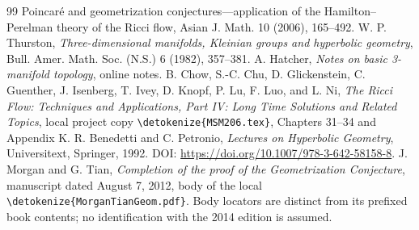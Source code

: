 \documentclass[10pt]{amsbook}
\DeclareRobustCommand{\code}[1]{\expandafter\nolinkurl\expandafter{\detokenize{#1}}}
\numberwithin{section}{chapter}
\numberwithin{equation}{chapter}
\begin{document}
\begin{thebibliography}{99}
{Poincar\'e and geometrization conjectures---application of the
Hamilton--Perelman theory of the Ricci flow}, Asian J. Math. 10 (2006),
165--492.
 W. P. Thurston, \emph{Three-dimensional manifolds,
Kleinian groups and hyperbolic geometry}, Bull. Amer. Math. Soc. (N.S.) 6
(1982), 357--381.
 A. Hatcher, \emph{Notes on basic
3-manifold topology}, online notes.
 B. Chow, S.-C. Chu, D. Glickenstein, C. Guenther,
J. Isenberg, T. Ivey, D. Knopf, P. Lu, F. Luo, and L. Ni,
\emph{The Ricci Flow: Techniques and Applications, Part IV: Long Time
Solutions and Related Topics}, local project copy \code{MSM206.tex},
Chapters 31--34 and Appendix K.
 R. Benedetti and C. Petronio,
\emph{Lectures on Hyperbolic Geometry}, Universitext, Springer, 1992.
DOI: \url{https://doi.org/10.1007/978-3-642-58158-8}.
J. Morgan and G. Tian, \emph{Completion of the proof of the Geometrization
Conjecture}, manuscript dated August 7, 2012, body of the local
\code{MorganTianGeom.pdf}. Body locators are distinct from its prefixed
book contents; no identification with the 2014 edition is assumed.


\end{thebibliography}
\end{document}
